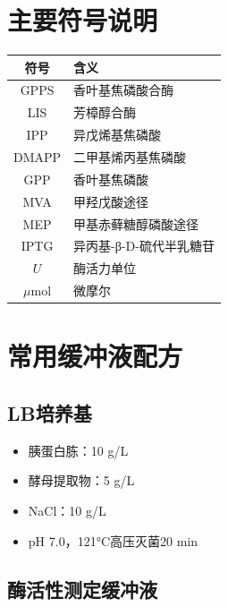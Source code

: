 \appendix       %

\section{主要符号说明}


\begin{table}[h]
  \centering
  \label{tab:notation}
  \begin{tabular}{cl}
    \toprule
    \textbf{符号} & \textbf{含义} \\
    \midrule
    GPPS & 香叶基焦磷酸合酶 \\
    LIS & 芳樟醇合酶 \\
    IPP & 异戊烯基焦磷酸 \\
    DMAPP & 二甲基烯丙基焦磷酸 \\
    GPP & 香叶基焦磷酸 \\
    MVA & 甲羟戊酸途径 \\
    MEP & 甲基赤藓糖醇磷酸途径 \\
    IPTG & 异丙基-β-D-硫代半乳糖苷 \\
    $U$ & 酶活力单位 \\
    $\mu$mol & 微摩尔 \\
    \bottomrule
  \end{tabular}
\end{table}

\section{常用缓冲液配方}

\subsection{LB培养基}

\begin{itemize}
    \item 胰蛋白胨：10 g/L
    \item 酵母提取物：5 g/L
    \item NaCl：10 g/L
    \item pH 7.0，121°C高压灭菌20 min
\end{itemize}

\subsection{酶活性测定缓冲液}

